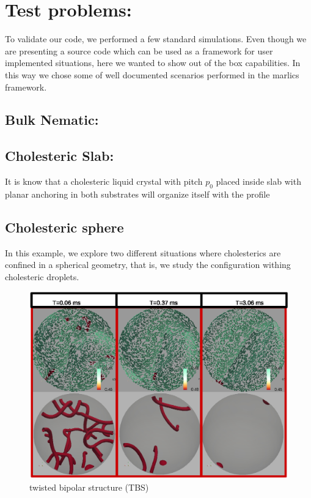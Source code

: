 \documentclass[final,5p,times,twocolumn]{elsarticle}
\begin{document}
\section{Test problems:}\label{sec:testing_marlics}

To validate our code, we performed a few standard simulations. Even
though we are presenting a source code which can be used as a
framework for user implemented situations, here we wanted to show out
of the box capabilities. In this way we chose some of well documented
scenarios performed in the marlics framework.


\subsection{Bulk Nematic:}



\subsection{Cholesteric Slab:}

It is know that a cholesteric liquid crystal with pitch $p_0$ placed
inside slab with planar anchoring in both substrates will organize
itself with the profile 

\subsection{Cholesteric sphere}

In this example, we explore two different situations where cholesterics are confined in a spherical geometry, that is, we study the configuration withing cholesteric droplets. 

\begin{figure}[h]
	\includegraphics[width=\linewidth]{n=2.eps}
	\caption{twisted bipolar structure (TBS)}
	\label{n=2}
\end{figure}
\end{document}
